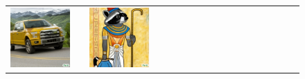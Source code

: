 \begin{figure}[ht!]
\begin{adjustwidth}{-0.8in}{-0.5in}
\begin{tabular}{cccccccccccccccccccc}
\multicolumn{2}{c}{\includegraphics[width=\threebythreecolwidth\textwidth]{figures/cherries/ford2017.jpg}} &&
\multicolumn{2}{c}{\includegraphics[width=\threebythreecolwidth\textwidth]{figures/cherries/egyptian.jpg}} &

\end{tabular}
\end{adjustwidth}
\end{figure}
